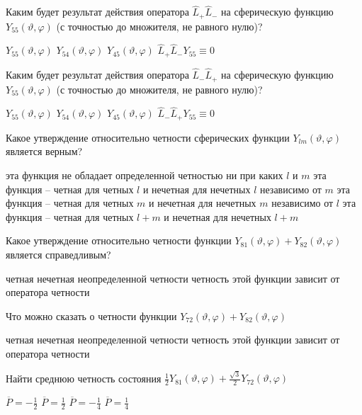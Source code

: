 \documentclass[11pt,a4paper]{exam}
\begin{document}
\begin{questions}
\question Каким будет результат действия оператора ${\hat L_ + }{\hat L_ - }$ на сферическую функцию ${Y_{55}}(\vartheta ,\varphi )$ (с точностью до множителя, не равного нулю)?
\begin{choices}
\choice ${Y_{55}}(\vartheta ,\varphi )$     
\choice ${Y_{54}}(\vartheta ,\varphi )$     
\choice ${Y_{45}}(\vartheta ,\varphi )$     
\choice ${\hat L_ + }{\hat L_ - }{Y_{55}} \equiv 0$
\end{choices}

\question Каким будет результат действия оператора ${\hat L_ - }{\hat L_ + }$ на сферическую функцию ${Y_{55}}(\vartheta ,\varphi )$ (с точностью до множителя, не равного нулю)?
\begin{choices}
\choice ${Y_{55}}(\vartheta ,\varphi )$     
\choice ${Y_{54}}(\vartheta ,\varphi )$     
\choice ${Y_{45}}(\vartheta ,\varphi )$     
\choice ${\hat L_ - }{\hat L_ + }{Y_{55}} \equiv 0$
\end{choices}

\question Какое утверждение относительно четности сферических функции ${Y_{lm}}(\vartheta ,\varphi )$ является верным?
\begin{choices}
\choice эта функция не обладает определенной четностью ни при каких $l$ и $m$
\choice эта функция – четная для четных $l$ и нечетная для нечетных $l$ независимо от $m$
\choice эта функция – четная для четных $m$ и нечетная для нечетных $m$ независимо от $l$
\choice эта функция – четная для четных $l + m$ и нечетная для нечетных $l + m$
\end{choices}

\question Какое утверждение относительно четности функции ${Y_{81}}(\vartheta ,\varphi ) + {Y_{82}}(\vartheta ,\varphi )$ является справедливым?
\begin{choices}
\choice четная            
\choice нечетная
\choice неопределенной четности 
\choice четность этой функции зависит от оператора четности
\end{choices}

\question Что можно сказать о четности функции ${Y_{72}}(\vartheta ,\varphi ) + {Y_{82}}(\vartheta ,\varphi )$
\begin{choices}
\choice четная            
\choice нечетная
\choice неопределенной четности 
\choice четность этой функции зависит от оператора четности
\end{choices}

\question Найти среднюю четность состояния $\frac{1}{2}{Y_{81}}(\vartheta ,\varphi ) + \frac{{\sqrt 3 }}{2}{Y_{72}}(\vartheta ,\varphi )$
\begin{choices}
\choice $\overline P  =  - \frac{1}{2}$     
\choice $\overline P  = \frac{1}{2}$     
\choice $\overline P  =  - \frac{1}{4}$     
\choice $\overline P  = \frac{1}{4}$
\end{choices}

\end{questions}
\end{document}
